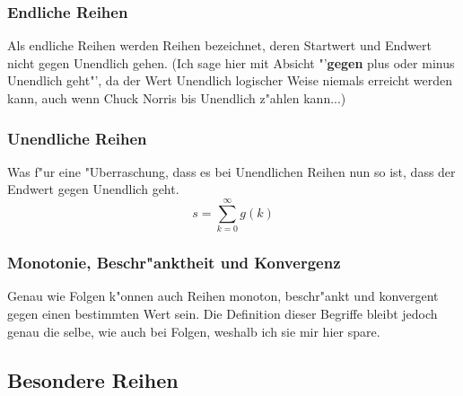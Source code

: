 \subsubsection{Endliche Reihen}
Als endliche Reihen werden Reihen bezeichnet, deren Startwert und Endwert nicht gegen Unendlich gehen. (Ich sage hier mit Absicht "'\textbf{gegen} plus oder minus Unendlich geht"', da der Wert Unendlich logischer Weise niemals erreicht werden kann, auch wenn Chuck Norris bis Unendlich z"ahlen kann...)

\subsubsection{Unendliche Reihen}
Was f"ur eine "Uberraschung, dass es bei Unendlichen Reihen nun so ist, dass der Endwert gegen Unendlich geht.
\begin{equation*}
s = \sum\limits_{k=0}^{\infty}g(k)
\end{equation*}

\subsubsection{Monotonie, Beschr"anktheit und Konvergenz}
Genau wie Folgen k"onnen auch Reihen monoton, beschr"ankt und konvergent gegen einen bestimmten Wert sein. Die Definition dieser Begriffe bleibt jedoch genau die selbe, wie auch bei Folgen, weshalb ich sie mir hier spare.

\subsection{Besondere Reihen}
